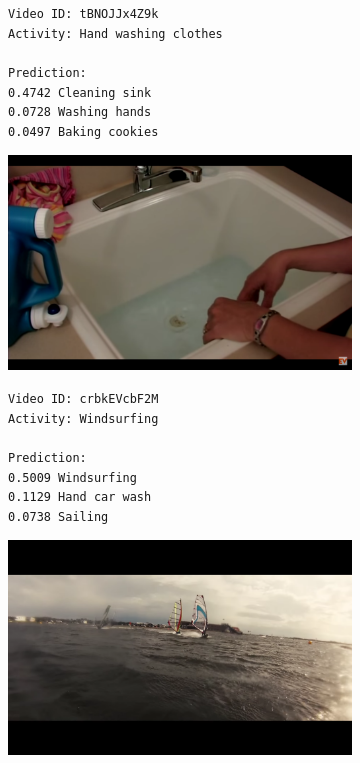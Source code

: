 \begin{figure}[H]
\begin{subfigure}[b]{.4\textwidth}
  \texttt{Video ID: tBNOJJx4Z9k \\
    Activity: Hand washing clothes \\
    \\
    Prediction: \\
    0.4742	Cleaning sink \\
    0.0728	Washing hands \\
    0.0497	Baking cookies \\}
\end{subfigure}%
\begin{subfigure}[b]{.6\textwidth}
  \centering
\includegraphics[width=0.95\linewidth]{img/results/activity_classification/results_visualization_classification_10}
\end{subfigure}

\begin{subfigure}[b]{.4\textwidth}
  \texttt{Video ID: crbkEVcbF2M \\
    Activity: Windsurfing \\
    \\
    Prediction: \\
    0.5009	Windsurfing \\
    0.1129	Hand car wash \\
    0.0738	Sailing \\}
\end{subfigure}%
\begin{subfigure}[b]{.6\textwidth}
  \centering
\includegraphics[width=0.95\linewidth]{img/results/activity_classification/results_visualization_classification_11}
\end{subfigure}


\end{figure}
